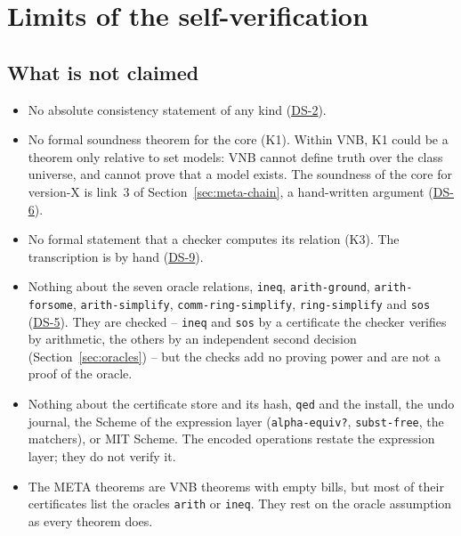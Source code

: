 \providecommand{\DS}[1]{\hyperref[ds:#1]{DS-#1}}

\chapter{Limits of the self-verification}
\label{ch:meta-limits}

\section{What is not claimed}\label{sec:meta-not-claimed}

\begin{itemize}
\item No absolute consistency statement of any kind (\DS{2}).
\item No formal soundness theorem for the core (K1).  Within VNB, K1 could
  be a theorem only relative to set models: VNB cannot define truth over
  the class universe, and cannot prove that a model exists.  The
  soundness of the core for version-X is link~3 of
  Section~\ref{sec:meta-chain}, a hand-written argument (\DS{6}).
\item No formal statement that a checker computes its relation (K3).  The
  transcription is by hand (\DS{9}).
\item Nothing about the seven oracle relations, \texttt{ineq},
  \texttt{arith-ground}, \texttt{arith-forsome}, \texttt{arith-simplify},
  \texttt{comm-ring-simplify}, \texttt{ring-simplify} and \texttt{sos}
  (\DS{5}).  They are checked -- \texttt{ineq} and \texttt{sos} by a
  certificate the checker verifies by arithmetic, the others by an
  independent second decision (Section~\ref{sec:oracles}) -- but the
  checks add no proving power and are not a proof of the oracle.
\item Nothing about the certificate store and its hash, \texttt{qed} and
  the install, the undo journal, the Scheme of the expression layer
  (\texttt{alpha-equiv?}, \texttt{subst-free}, the matchers), or MIT
  Scheme.  The encoded operations restate the expression layer; they do
  not verify it.
\item The META theorems are VNB theorems with empty bills, but most of
  their certificates list the oracles \texttt{arith} or \texttt{ineq}.
  They rest on the oracle assumption as every theorem does.
\end{itemize}

